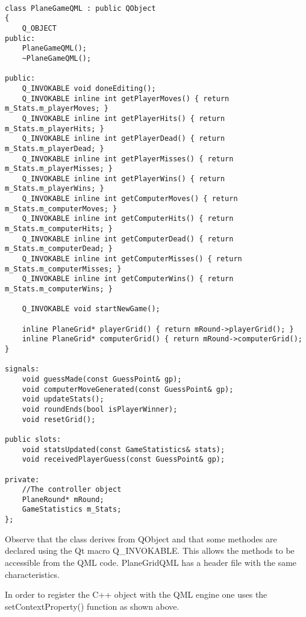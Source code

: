 \begin{lstlisting}

class PlaneGameQML : public QObject
{
	Q_OBJECT
public:
	PlaneGameQML();
	~PlaneGameQML();

public:
	Q_INVOKABLE void doneEditing();
	Q_INVOKABLE inline int getPlayerMoves() { return m_Stats.m_playerMoves; }
	Q_INVOKABLE inline int getPlayerHits() { return m_Stats.m_playerHits; }
	Q_INVOKABLE inline int getPlayerDead() { return m_Stats.m_playerDead; }
	Q_INVOKABLE inline int getPlayerMisses() { return m_Stats.m_playerMisses; }
	Q_INVOKABLE inline int getPlayerWins() { return m_Stats.m_playerWins; }
	Q_INVOKABLE inline int getComputerMoves() { return m_Stats.m_computerMoves; }
	Q_INVOKABLE inline int getComputerHits() { return m_Stats.m_computerHits; }
	Q_INVOKABLE inline int getComputerDead() { return m_Stats.m_computerDead; }
	Q_INVOKABLE inline int getComputerMisses() { return m_Stats.m_computerMisses; }
	Q_INVOKABLE inline int getComputerWins() { return m_Stats.m_computerWins; }
	
	Q_INVOKABLE void startNewGame();
	
	inline PlaneGrid* playerGrid() { return mRound->playerGrid(); }
	inline PlaneGrid* computerGrid() { return mRound->computerGrid(); }

signals:
	void guessMade(const GuessPoint& gp);
	void computerMoveGenerated(const GuessPoint& gp);    
	void updateStats();
	void roundEnds(bool isPlayerWinner);
	void resetGrid();

public slots:
	void statsUpdated(const GameStatistics& stats);
	void receivedPlayerGuess(const GuessPoint& gp);

private:
	//The controller object
	PlaneRound* mRound;
	GameStatistics m_Stats;
};

\end{lstlisting}

Observe that the class derives from QObject and that some methodes are declared using the Qt macro Q\_INVOKABLE. This allows the methods to be accessible from the QML code. PlaneGridQML has a header file with the same characteristics.

In order to register the C++ object with the QML engine one uses the setContextProperty() function as shown above.
